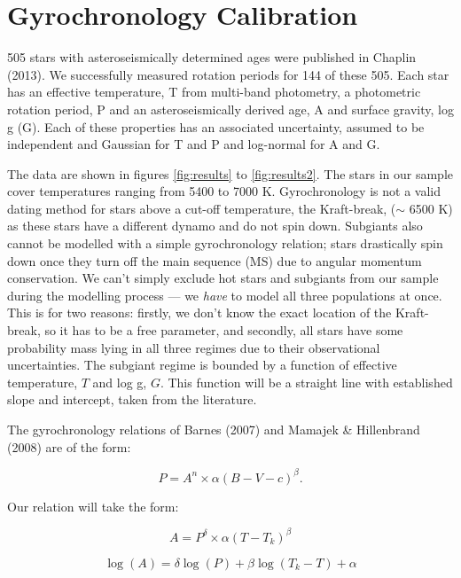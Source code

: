 \documentclass[12pt,preprint]{aastex}
\begin{document}
\section{Gyrochronology Calibration}

505 stars with asteroseismically determined ages were published in Chaplin (2013).
We successfully measured rotation periods for 144 of these 505.
Each star has an effective temperature, T from multi-band photometry, a photometric rotation period, P and an asteroseismically derived age, A and surface gravity, log g (G).
Each of these properties has an associated uncertainty, assumed to be independent and Gaussian for T and P and log-normal for A and G.

The data are shown in figures \ref{fig:results} to \ref{fig:results2}.
The stars in our sample cover temperatures ranging from 5400 to 7000 K.
Gyrochronology is not a valid dating method for stars above a cut-off temperature, the Kraft-break, ($\sim$ 6500 K) as these stars have a different dynamo and do not spin down.
Subgiants also cannot be modelled with a simple gyrochronology relation; stars drastically spin down once they turn off the main sequence (MS) due to angular momentum conservation.
We can't simply exclude hot stars and subgiants from our sample during the modelling process --- we \emph{have} to model all three populations at once.
This is for two reasons: firstly, we don't know the exact location of the Kraft-break, so it has to be a free parameter,
and secondly, all stars have some probability mass lying in all three regimes due to their observational uncertainties.
The subgiant regime is bounded by a function of effective temperature, $T$ and log g, $G$.
This function will be a straight line with established slope and intercept, taken from the literature.

The gyrochronology relations of Barnes (2007) and Mamajek \& Hillenbrand (2008) are of the form:

\begin{equation}
P = A^n \times \alpha(B-V-c)^\beta.
\end{equation}

Our relation will take the form:

\begin{equation}
	A = P^{\delta} \times \alpha(T - T_k)^{\beta}
\label{eq:functional_form2}
\end{equation}

\begin{equation}
	\log(A) = \delta \log(P) + \beta \log(T_k - T) + \alpha
\label{eq:functional_form2}
\end{equation}
\end{document}

